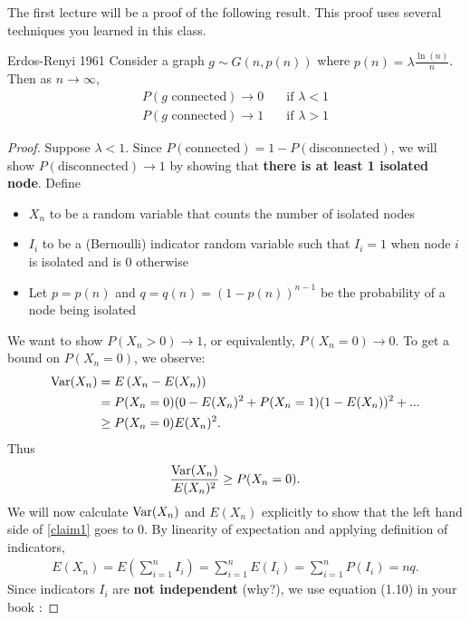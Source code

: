 \documentclass[./some_latex_template.tex]{subfiles}
\begin{document}
The first lecture will be a proof of the following result. This proof uses several techniques you learned in this class.

\begin{theorembox}{Erdos-Renyi 1961}{}
Consider a graph $g \sim G(n, p(n))$ where $p(n) = \lambda \frac{\ln(n)}{n}$. Then as $n \rightarrow \infty$,
\begin{align*}
	P(g \text{ connected}) \rightarrow 0 & \quad \text{if } \lambda < 1\\
	P(g \text{ connected}) \rightarrow 1 & \quad \text{if } \lambda > 1
\end{align*}
\end{theorembox}

\begin{proof}
Suppose $\lambda < 1$. Since $P(\text{connected}) = 1 - P(\text{disconnected})$, we will show $P(\text{disconnected}) \rightarrow 1$ by showing that \textbf{there is at least 1 isolated node}. Define
\begin{itemize}
	\item $X_n$ to be a random variable that counts the number of isolated nodes
	\item $I_i$ to be a (Bernoulli) indicator random variable such that $I_i = 1$ when node $i$ is isolated and is $0$ otherwise
	\item Let $p = p(n)$ and $q = q(n) = (1 - p(n))^{n - 1}$ be  the probability of a node being isolated
\end{itemize}
We want to show $P(X_n > 0) \rightarrow 1$, or equivalently, $P(X_n = 0) \rightarrow 0$. To get a bound on $P(X_n = 0)$, we observe:
\begin{align*}
	\mathop{\rm Var}\nolimits(X_n) 
	&= E\left(X_n - E(X_n)\right)\\
	&= P(X_n = 0)(0 - E(X_n)^2 + P(X_n = 1)(1 - E(X_n))^2 + ...\\
	&\ge P(X_n = 0)E(X_n)^2.
\end{align*}
Thus 
\begin{align}\label{claim1}
\frac{\mathop{\rm Var}\nolimits(X_n)}{E(X_n)^2} \ge P(X_n=0). 
\end{align}
We will now calculate $\mathop{\rm Var}\nolimits(X_n)$ and $E(X_n)$ explicitly to show that the left hand side of \eqref{claim1} goes to 0. By linearity of expectation and applying definition of indicators,
\begin{align*}
	E(X_n) = E\left(\sum_{i=1}^n I_i\right) = \sum_{i=1}^nE(I_i) = \sum_{i=1}^nP(I_i) = nq.
\end{align*}
Since indicators $I_i$ are \textbf{not independent} (why?), we use equation (1.10) in your book \cite{lange2010applied}:

\end{proof}
\end{document}
